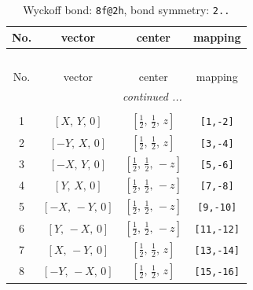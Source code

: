 \documentclass[fleqn,8pt]{jsarticle}
\begin{document}
\begin{longtable}{cccc}
\caption{Wyckoff bond: {\tt 8f@2h}, bond symmetry: {\tt 2..}}
 \\
 \hline \hline
No. & vector & center & mapping \\ \hline \endfirsthead

\multicolumn{3}{l}{\tablename\ \thetable{}} \\
 \hline \hline
No. & vector & center & mapping \\ \hline \endhead

 \hline \hline
\multicolumn{3}{r}{\footnotesize\it continued ...} \\ \endfoot

 \hline \hline
\multicolumn{3}{r}{} \\ \endlastfoot

1 & $\left[ X,\, Y,\, 0 \right]$ & $\left[ \frac{1}{2},\, \frac{1}{2},\, z \right]$ & {\tt [1,-2]} \\ \hline
2 & $\left[ - Y,\, X,\, 0 \right]$ & $\left[ \frac{1}{2},\, \frac{1}{2},\, z \right]$ & {\tt [3,-4]} \\ \hline
3 & $\left[ - X,\, Y,\, 0 \right]$ & $\left[ \frac{1}{2},\, \frac{1}{2},\, - z \right]$ & {\tt [5,-6]} \\ \hline
4 & $\left[ Y,\, X,\, 0 \right]$ & $\left[ \frac{1}{2},\, \frac{1}{2},\, - z \right]$ & {\tt [7,-8]} \\ \hline
5 & $\left[ - X,\, - Y,\, 0 \right]$ & $\left[ \frac{1}{2},\, \frac{1}{2},\, - z \right]$ & {\tt [9,-10]} \\ \hline
6 & $\left[ Y,\, - X,\, 0 \right]$ & $\left[ \frac{1}{2},\, \frac{1}{2},\, - z \right]$ & {\tt [11,-12]} \\ \hline
7 & $\left[ X,\, - Y,\, 0 \right]$ & $\left[ \frac{1}{2},\, \frac{1}{2},\, z \right]$ & {\tt [13,-14]} \\ \hline
8 & $\left[ - Y,\, - X,\, 0 \right]$ & $\left[ \frac{1}{2},\, \frac{1}{2},\, z \right]$ & {\tt [15,-16]} \\
\end{longtable}
\renewcommand{\arraystretch}{1.2}
\end{document}
